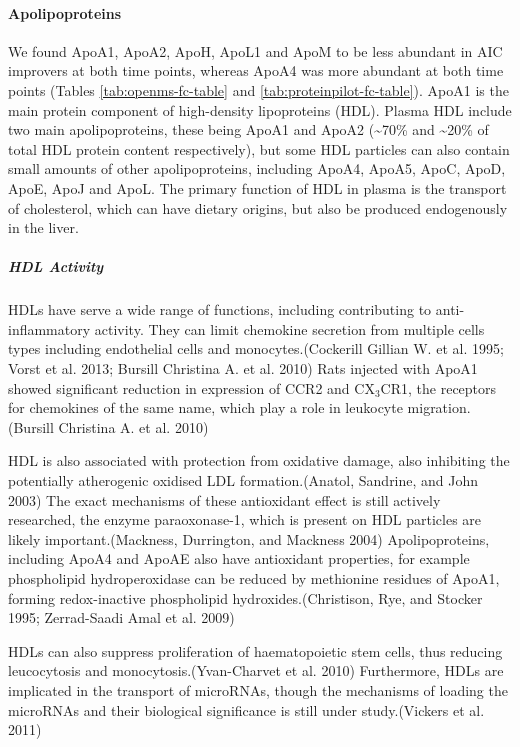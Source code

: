 \documentclass[9pt,lineno]{elife}
\begin{document}
\hypertarget{apolipoproteins}{%
\paragraph{Apolipoproteins}\label{apolipoproteins}}

We found ApoA1, ApoA2, ApoH, ApoL1 and ApoM to be less abundant in AIC improvers at both time points, whereas ApoA4 was more abundant at both time points (Tables \ref{tab:openms-fc-table} and \ref{tab:proteinpilot-fc-table}).
ApoA1 is the main protein component of high-density lipoproteins (HDL).
Plasma HDL include two main apolipoproteins, these being ApoA1 and ApoA2 (\textasciitilde70\% and \textasciitilde20\% of total HDL protein content respectively), but some HDL particles can also contain small amounts of other apolipoproteins, including ApoA4, ApoA5, ApoC, ApoD, ApoE, ApoJ and ApoL.
The primary function of HDL in plasma is the transport of cholesterol, which can have dietary origins, but also be produced endogenously in the liver.

\hypertarget{hdl-activity}{%
\subparagraph{HDL Activity}\label{hdl-activity}}

HDLs have serve a wide range of functions, including contributing to anti-inflammatory activity.
They can limit chemokine secretion from multiple cells types including endothelial cells and monocytes.(Cockerill Gillian W. et al. 1995; Vorst et al. 2013; Bursill Christina A. et al. 2010)
Rats injected with ApoA1 showed significant reduction in expression of CCR2 and CX\(_3\)CR1, the receptors for chemokines of the same name, which play a role in leukocyte migration. (Bursill Christina A. et al. 2010)

HDL is also associated with protection from oxidative damage, also inhibiting the potentially atherogenic oxidised LDL formation.(Anatol, Sandrine, and John 2003)
The exact mechanisms of these antioxidant effect is still actively researched, the enzyme paraoxonase-1, which is present on HDL particles are likely important.(Mackness, Durrington, and Mackness 2004)
Apolipoproteins, including ApoA4 and ApoAE also have antioxidant properties, for example phospholipid hydroperoxidase can be reduced by methionine residues of ApoA1, forming redox-inactive phospholipid hydroxides.(Christison, Rye, and Stocker 1995; Zerrad-Saadi Amal et al. 2009)

HDLs can also suppress proliferation of haematopoietic stem cells, thus reducing leucocytosis and monocytosis.(Yvan-Charvet et al. 2010)
Furthermore, HDLs are implicated in the transport of microRNAs, though the mechanisms of loading the microRNAs and their biological significance is still under study.(Vickers et al. 2011)
\end{document}
